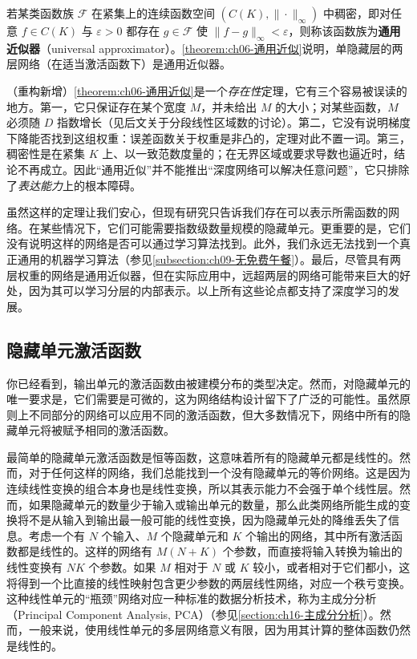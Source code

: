 \documentclass[../../main.tex]{subfiles}
\begin{document}
\begin{definition}[通用近似器]\label{definition:ch06-通用近似器}
若某类函数族 $\mathcal{F}$ 在紧集上的连续函数空间 $(C(K),\|\cdot\|_{\infty})$ 中稠密，即对任意 $f\in C(K)$ 与 $\varepsilon>0$ 都存在 $g\in\mathcal{F}$ 使 $\|f-g\|_{\infty}<\varepsilon$，则称该函数族为\textbf{通用近似器}（universal approximator）。\cref{theorem:ch06-通用近似}说明，单隐藏层的两层网络（在适当激活函数下）是通用近似器。
\end{definition}

\begin{remark}（重构新增）\cref{theorem:ch06-通用近似}是一个\emph{存在性}定理，它有三个容易被误读的地方。第一，它只保证存在某个宽度 $M$，并未给出 $M$ 的大小；对某些函数，$M$ 必须随 $D$ 指数增长（见后文关于分段线性区域数的讨论）。第二，它没有说明梯度下降能否找到这组权重：误差函数关于权重是非凸的，定理对此不置一词。第三，稠密性是在紧集 $K$ 上、以一致范数度量的；在无界区域或要求导数也逼近时，结论不再成立。因此“通用近似”并不能推出“深度网络可以解决任意问题”，它只排除了\emph{表达能力}上的根本障碍。
\end{remark}

虽然这样的定理让我们安心，但现有研究只告诉我们存在可以表示所需函数的网络。在某些情况下，它们可能需要指数级数量规模的隐藏单元。更重要的是，它们没有说明这样的网络是否可以通过学习算法找到。此外，我们永远无法找到一个真正通用的机器学习算法（参见\cref{subsection:ch09-无免费午餐}）。最后，尽管具有两层权重的网络是通用近似器，但在实际应用中，远超两层的网络可能带来巨大的好处，因为其可以学习分层的内部表示。以上所有这些论点都支持了深度学习的发展。

\subsection{隐藏单元激活函数}\label{subsection:ch06-隐藏单元激活函数}

你已经看到，输出单元的激活函数由被建模分布的类型决定。然而，对隐藏单元的唯一要求是，它们需要是可微的，这为网络结构设计留下了广泛的可能性。虽然原则上不同部分的网络可以应用不同的激活函数，但大多数情况下，网络中所有的隐藏单元将被赋予相同的激活函数。

最简单的隐藏单元激活函数是恒等函数，这意味着所有的隐藏单元都是线性的。然而，对于任何这样的网络，我们总能找到一个没有隐藏单元的等价网络。这是因为连续线性变换的组合本身也是线性变换，所以其表示能力不会强于单个线性层。然而，如果隐藏单元的数量少于输入或输出单元的数量，那么此类网络所能生成的变换将不是从输入到输出最一般可能的线性变换，因为隐藏单元处的降维丢失了信息。考虑一个有 $N$ 个输入、$M$ 个隐藏单元和 $K$ 个输出的网络，其中所有激活函数都是线性的。这样的网络有 $M(N+K)$ 个参数，而直接将输入转换为输出的线性变换有 $NK$ 个参数。如果 $M$ 相对于 $N$ 或 $K$ 较小，或者相对于它们都小，这将得到一个比直接的线性映射包含更少参数的两层线性网络，对应一个秩亏变换。这种线性单元的“瓶颈”网络对应一种标准的数据分析技术，称为主成分分析（Principal Component Analysis, PCA）（参见\cref{section:ch16-主成分分析}）。然而，一般来说，使用线性单元的多层网络意义有限，因为用其计算的整体函数仍然是线性的。
\end{document}
